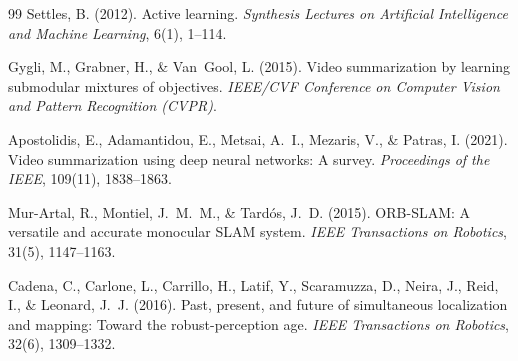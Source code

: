 \documentclass[12pt,a4paper]{article}
\begin{document}
\begin{thebibliography}{99}
Settles, B. (2012).
Active learning.
\emph{Synthesis Lectures on Artificial Intelligence and Machine Learning}, 6(1), 1--114.

Gygli, M., Grabner, H., \& Van~Gool, L. (2015).
Video summarization by learning submodular mixtures of objectives.
\emph{IEEE/CVF Conference on Computer Vision and Pattern Recognition (CVPR)}.

Apostolidis, E., Adamantidou, E., Metsai, A.~I., Mezaris, V., \& Patras, I. (2021).
Video summarization using deep neural networks: A survey.
\emph{Proceedings of the IEEE}, 109(11), 1838--1863.

Mur-Artal, R., Montiel, J.~M.~M., \& Tard{\'o}s, J.~D. (2015).
ORB-SLAM: A versatile and accurate monocular SLAM system.
\emph{IEEE Transactions on Robotics}, 31(5), 1147--1163.

Cadena, C., Carlone, L., Carrillo, H., Latif, Y., Scaramuzza, D., Neira, J., Reid, I., \& Leonard, J.~J. (2016).
Past, present, and future of simultaneous localization and mapping: Toward the robust-perception age.
\emph{IEEE Transactions on Robotics}, 32(6), 1309--1332.

\end{thebibliography}
\end{document}
